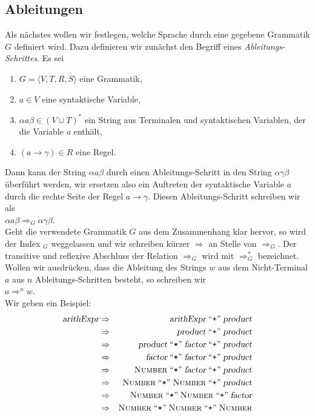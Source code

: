 \subsection{Ableitungen}
Als n\"achstes wollen wir festlegen, welche Sprache durch eine gegebene Grammatik $G$ definiert wird.
Dazu definieren wir zun\"achst den Begriff eines \emph{Ableitungs-Schrittes}.  Es sei
\begin{enumerate}
\item $G = \langle V, T, R, S \rangle$ eine Grammatik,
\item $a \in V$ eine syntaktische Variable,
\item $\alpha a \beta \in (V \cup T)^*$ ein String aus Terminalen und syntaktischen Variablen,
      der die Variable $a$ enth\"alt,
\item $(a \rightarrow \gamma) \in R$ eine Regel.
\end{enumerate}
Dann kann der String $\alpha a \beta$ durch einen Ableitungs-Schritt in den String 
$\alpha \gamma \beta$ \"uberf\"uhrt werden, wir ersetzen also ein Auftreten der syntaktische Variable
$a$ durch die rechte Seite der Regel $a \rightarrow \gamma$.  Diesen Ableitungs-Schritt schreiben
wir als
\\[0.2cm]
\hspace*{1.3cm}
$\alpha a \beta \Rightarrow_G \alpha \gamma \beta$.
\\[0.2cm]
Geht die verwendete Grammatik $G$ aus dem Zusammenhang klar hervor, so wird der Index $_G$
weggelassen und wir schreiben k\"urzer $\Rightarrow$ an Stelle von $\Rightarrow_G$.
Der transitive und reflexive Abschluss der Relation $\Rightarrow_G$ wird mit $\Rightarrow_G^*$
bezeichnet.  Wollen wir ausdr\"ucken, dass die Ableitung des Strings $w$ aus dem
Nicht-Terminal $a$ aus $n$ Ableitungs-Schritten
besteht, so schreiben wir 
\\[0.2cm]
\hspace*{1.3cm}
$a \Rightarrow^n w$.
\\[0.2cm]  
Wir geben ein Beispiel:
\begin{eqnarray*}
\textsl{arithExpr} 
& \Rightarrow & \textsl{arithExpr} \;\mbox{``\texttt{+}''}\; \textsl{product}  \\
& \Rightarrow & \textsl{product} \;\mbox{``\texttt{+}''}\; \textsl{product}  \\
& \Rightarrow & \textsl{product} \;\mbox{``\texttt{*}''}\; \textsl{factor} \;\mbox{``\texttt{+}''}\; \textsl{product} \\
& \Rightarrow & \textsl{factor} \;\mbox{``\texttt{*}''}\; \textsl{factor} \;\mbox{``\texttt{+}''}\; \textsl{product}  \\
& \Rightarrow & \textsc{Number} \;\mbox{``\texttt{*}''}\; \textsl{factor} \;\mbox{``\texttt{+}''}\; \textsl{product}  \\
& \Rightarrow & \textsc{Number} \;\mbox{``\texttt{*}''}\; \textsc{Number} \;\mbox{``\texttt{+}''}\; \textsl{product}  \\
& \Rightarrow & \textsc{Number} \;\mbox{``\texttt{*}''}\; \textsc{Number} \;\mbox{``\texttt{+}''}\; \textsl{factor}   \\
& \Rightarrow & \textsc{Number} \;\mbox{``\texttt{*}''}\; \textsc{Number} \;\mbox{``\texttt{+}''}\; \textsc{Number}   
\end{eqnarray*}
